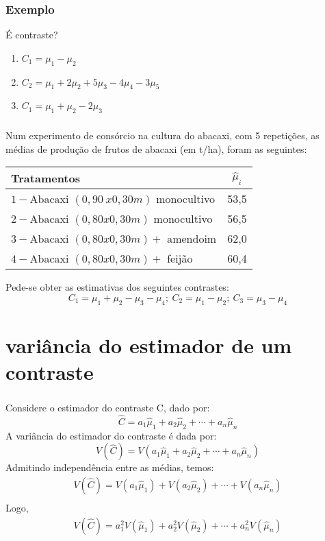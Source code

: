 \documentclass[14pt,aspectratio=1610]{beamer}
\begin{document}
\begin{frame}{}
\frametitle{Exemplo}
\begin{block}{}
\justifying
 É contraste?
 \begin{enumerate}
 \item $C_{1}=\mu_{1}-\mu_{2}$ \pause
 \item $C_{2}=\mu_{1}+2\mu_{2}+5\mu_{3}-4\mu_{4}-3\mu_{5}$ \pause
 \item $C_{1}=\mu_{1}+\mu_{2}-2\mu_{3}$
 \end{enumerate}
\end{block}
\end{frame}

\begin{frame}{}
\frametitle{}
\begin{block}{}
Num experimento de consórcio na cultura do abacaxi, com 5 repetições, as médias de
produção de frutos de abacaxi (em t/ha), foram as seguintes:
\begin{table}[]
\begin{tabular}{lc}
\hline
Tratamentos&$\hat{\mu}_{i}$\\
\hline
$1 - $Abacaxi $(0,90\ x 0,30m)$ monocultivo& 53,5\\
$2 - $Abacaxi $(0,80 x 0,30m)$ monocultivo& 56,5\\
$3 - $Abacaxi $(0,80 x 0,30m) +$ amendoim & 62,0\\
$4 - $Abacaxi $(0,80 x 0,30m) +$ feijão   & 60,4\\
\hline
\end{tabular}
\end{table}
Pede-se obter as estimativas dos seguintes contrastes:
$$C_{1}=\mu_{1}+\mu_{2}-\mu_{3}-\mu_{4};\ C_{2}=\mu_{1}-\mu_{2};\ C_{3}=\mu_{3}-\mu_{4}$$
\end{block}
\end{frame}

\section{variância do estimador de um contraste}
\begin{frame}{}
\frametitle{}
\begin{block}{}
Considere o estimador do contraste C, dado por:
$$\hat{C}=a_{1}\hat{\mu}_{1}+a_{2}\hat{\mu}_{2}+\cdots+a_{n}\hat{\mu}_{n}$$
A variância do estimador do contraste é dada por:
$$V(\hat{C})=V(a_{1}\hat{\mu}_{1}+a_{2}\hat{\mu}_{2}+\cdots+a_{n}\hat{\mu}_{n})$$
Admitindo independência entre as médias, temos:
\begin{align*}
V(\hat{C})=V(a_{1}\hat{\mu}_{1})+V(a_{2}\hat{\mu}_{2})+\cdots+V(a_{n}\hat{\mu}_{n})\\
\end{align*}
Logo,
\begin{align*}
V(\hat{C})=a_{1}^{2}V(\hat{\mu}_{1})+a_{2}^{2}V(\hat{\mu}_{2})+\cdots+a_{n}^{2}V(\hat{\mu}_{n})
\end{align*}
\end{block}
\end{frame}
\end{document}
